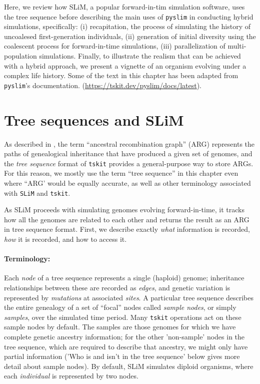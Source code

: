 \documentclass[12pt]{article}
\newcommand{\tskit}[0]{\texttt{tskit}\xspace}
\newcommand{\slim}[0]{\texttt{SLiM}\xspace}
\newcommand{\pyslim}[0]{\texttt{pyslim}\xspace}
\begin{document}
Here, we review how SLiM, a popular forward-in-tim simulation software, uses the tree sequence before describing
the main uses of \pyslim in conducting hybrid simulations, specifically:
(i) recapitation, the process of simulating the history of uncoalesed first-generation individuals,
(ii) generation of initial diversity using the coalescent process for forward-in-time simulations,
(iii) parallelization of multi-population simulations.
Finally, to illustrate the realism that can be achieved with a hybrid approach, we present a vignette of an organism evolving under a complex life history.
Some of the text in this chapter has been adapted from \pyslim's documentation.
(\url{https://tskit.dev/pyslim/docs/latest}).

\section{Tree sequences and SLiM}
As described in \citet{wong}, the term ``ancestral recombination graph'' (ARG)
represents the paths of genealogical inheritance that have produced a given set of genomes,
and the \emph{tree sequence} format of \tskit provides a general-purpose way to store ARGs.
For this reason, we mostly use the term ``tree sequence'' in this chapter even where ``ARG'
would be equally accurate, as well as other terminology associated with \slim and \tskit \citet{XXX}.

As SLiM proceeds with simulating genomes evolving forward-in-time, it tracks how all the genomes are
related to each other and returns the result as an ARG in tree sequence format. First, we describe
exactly \emph{what} information is recorded, \emph{how} it is recorded, and how to access it.

\paragraph{Terminology:}
Each \textit{node} of a tree sequence represents a single (haploid) genome;
inheritance relationships between these are recorded as \textit{edges},
and genetic variation is represented by \textit{mutations} at associated \textit{sites}.
A particular tree sequence describes the entire genealogy of a set of ``focal'' nodes called
\textit{sample nodes}, or simply \textit{samples}, over the simulated time period.
Many \tskit operations act on these sample nodes by default.
The samples are those genomes for which we have complete genetic ancestry information; for the other 'non-sample'
nodes in the tree sequence, which are required to describe that ancestry, we might only have partial information
('Who is and isn't in the tree sequence' below gives more detail about sample nodes).
By default, SLiM simulates diploid organisms, where each \textit{individual} is represented by two nodes.
\end{document}
